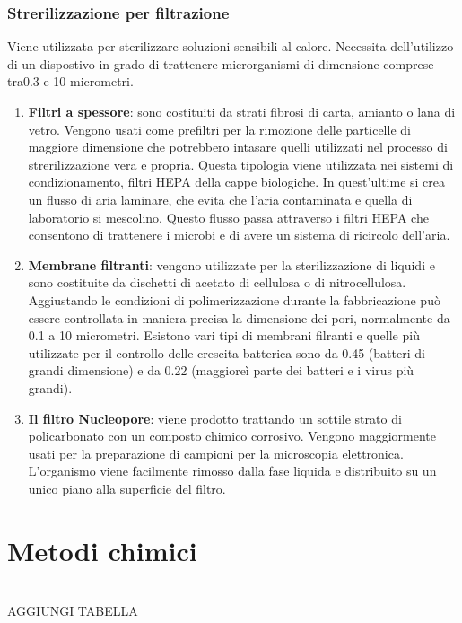\subsubsection{Strerilizzazione per filtrazione}
Viene utilizzata per sterilizzare soluzioni sensibili al calore. Necessita dell'utilizzo di un dispostivo in grado di trattenere microrganismi di dimensione comprese tra0.3 e 10 micrometri. 
\begin{enumerate}
    \item \textbf{Filtri a spessore}: sono costituiti da strati fibrosi di carta, amianto o lana di vetro. Vengono usati come prefiltri per la rimozione delle particelle di maggiore dimensione che potrebbero intasare quelli utilizzati nel processo di strerilizzazione vera e propria. Questa tipologia viene utilizzata nei sistemi di condizionamento, filtri HEPA della cappe biologiche. In quest'ultime si crea un flusso di aria laminare, che evita che l'aria contaminata e quella di laboratorio si mescolino. Questo flusso passa attraverso i filtri HEPA che consentono di trattenere i microbi e di avere un sistema di ricircolo dell'aria. 
    \item \textbf{Membrane filtranti}: vengono utilizzate per la sterilizzazione di liquidi e sono costituite da dischetti di acetato di cellulosa o di nitrocellulosa. Aggiustando le condizioni di polimerizzazione durante la fabbricazione può essere controllata in maniera precisa la dimensione dei pori, normalmente da 0.1 a 10 micrometri. Esistono vari tipi di membrani filranti e quelle più utilizzate per il controllo delle crescita batterica sono da 0.45 (batteri di grandi dimensione) e da 0.22 (maggioreì parte dei batteri e i virus più grandi). 
    \item \textbf{Il filtro Nucleopore}: viene prodotto trattando un sottile strato di policarbonato con un composto chimico corrosivo. Vengono maggiormente usati per la preparazione di campioni per la microscopia elettronica. L'organismo viene facilmente rimosso dalla fase liquida e distribuito su un unico piano alla superficie del filtro. 
\end{enumerate}
\section{Metodi chimici}
\\AGGIUNGI TABELLA
